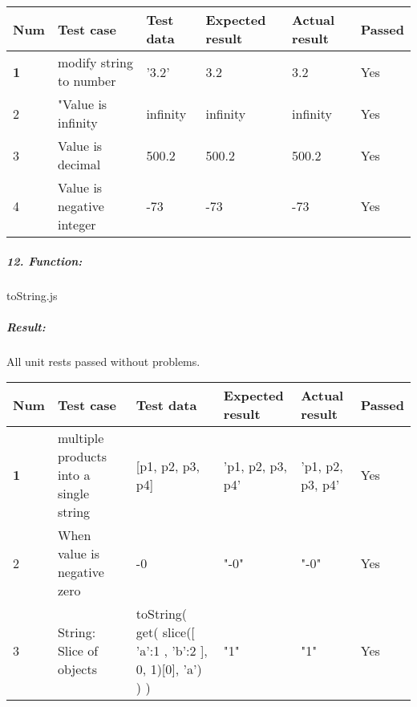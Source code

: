 \documentclass[a4paper, 12pt]{article}
\begin{document}
    \begin{table}[h!]
	\begin{tabular}{|l|p{3cm}|p{2cm}|p{2cm}|p{2.5cm}|l|}
		\hline
		Num & Test case        					& Test data 					& Expected result 					& Actual result 		& Passed \\ \hline
		\textbf{1}   & modify string to number 			& '3.2'     					& 3.2               				& 3.2             		& Yes     \\ \hline
			2   & "Value is infinity 			& infinity     					& infinity               				& infinity             		& Yes     \\ \hline
				3   & Value is decimal 			& 500.2     					& 500.2               				& 500.2             		& Yes     \\ \hline
					4   & Value is negative integer			& -73    					& -73               				& -73             		& Yes     \\ \hline
	
	\end{tabular}
\end{table}

\newpage
		\hypertarget{header-n558}{%
		\subparagraph{12. Function:}\label{header-n558}}
		
		toString.js
		
		\hypertarget{header-n526}{%
		\subparagraph{Result:}\label{header-n526}}
        All unit rests passed without problems.
		
		\begin{table}[h!]
	\begin{tabular}{|l|p{3cm}|p{2cm}|p{2cm}|p{2.5cm}|l|}
		\hline
		Num & Test case        										& Test data 					& Expected result 					& Actual result 		& Passed \\ \hline
		\textbf{1}   & multiple products into a single string 				& {[}p1, p2, p3, p4{]}     		& 'p1, p2, p3, p4'                	& 'p1, p2, p3, p4'                		& Yes     \\ \hline
	2       & When value is negative zero 			             	& {-0}     	                 	& "-0"                          	&     "-0"         		& Yes     \\ \hline
		3       & String: Slice of objects 			             	& {toString( get( slice([{ 'a':1 }, { 'b':2 }], 0, 1)[0], 'a') ) )}     	                 	& "1"                          	&     "1"         		& Yes     \\ \hline
	
	\end{tabular}
\end{table}
\end{document}

